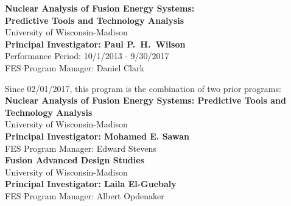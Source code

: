 
\begin{titlepage}
  \begin{center}

    {\Large\bfseries Nuclear Analysis of Fusion Energy Systems:\\ Predictive Tools and Technology Analysis}\\[12pt]
    University of Wisconsin-Madison\\[8pt]
    {\bfseries Principal Investigator: Paul P.\ H.\ Wilson}\\[8pt]
    Performance Period: 10/1/2013 - 9/30/2017\\
    FES Program Manager: Daniel Clark

    \vspace{2cm}
    Since 02/01/2017, this program is the combination of two prior programs:\\[1cm]
    {\large\bfseries Nuclear Analysis of Fusion Energy Systems: Predictive Tools and Technology Analysis}\\[6pt]
    University of Wisconsin-Madison\\[6pt]
    {\bfseries Principal Investigator: Mohamed E. Sawan}\\[6pt]
    FES Program Manager: Edward Stevens\\[2cm]

    {\large\bfseries Fusion Advanced Design Studies}\\[6pt]
    University of Wisconsin-Madison\\[6pt]
    {\bfseries Principal Investigator: Laila El-Guebaly}\\[6pt]
    FES Program Manager: Albert Opdenaker


    
  \end{center}
\end{titlepage}
